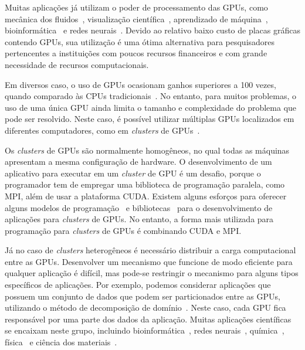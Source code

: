 Muitas aplicações já utilizam o poder de processamento das GPUs, como mecânica
dos fluidos~\citep{fluido}, visualização científica~\citep{visualizacao},
aprendizado de máquina~\citep{Aprendizado}, bioinformática~\citep{rozante} e redes
neurais~\citep{siang}. Devido ao relativo baixo custo de placas gráficas contendo
GPUs, sua utilização é uma ótima alternativa para pesquisadores pertencentes a
instituições com poucos recursos financeiros e com grande necessidade de
recursos computacionais.

Em diversos caso, o uso de GPUs ocasionam ganhos superiores a 100 vezes, quando
comparado às CPUs tradicionais~\citep{Vouzis15012011}. No entanto, para muitos problemas, o uso de uma
única GPU ainda limita o tamanho e complexidade do problema que pode ser
resolvido. Neste caso, é possível utilizar múltiplas GPUs localizados em
diferentes computadores, como em \emph{clusters} de GPUs~\citep{raphael,
  cluster}.

Os \emph{clusters} de GPUs são normalmente homogêneos, no qual todas as
máquinas apresentam a mesma configuração de hardware. O desenvolvimento de um
aplicativo para executar em um \emph{cluster} de GPU é um desafio, porque o
programador tem de empregar uma biblioteca de programação paralela, como MPI,
além de usar a plataforma CUDA. Existem alguns esforços para oferecer alguns
modelos de programação~\citep{appCientificas, wave} e bibliotecas~\citep{snucl,
  Flat} para o desenvolvimento de aplicações para \emph{clusters} de GPUs. No
entanto, a forma mais utilizada para programação para \emph{clusters} de GPUs
é combinando CUDA e MPI.

Já no caso de \emph{clusters} heterogêneos é necessário distribuir a carga
computacional entre as GPUs. Desenvolver um mecanismo que funcione de modo
eficiente para qualquer aplicação é difícil, mas pode-se restringir o mecanismo
para alguns tipos específicos de aplicações. Por exemplo, podemos considerar
aplicações que possuem um conjunto de dados que podem ser particionados entre as
GPUs, utilizando o método de decomposição de domínio~\citep{CNM:CNM1640090307}. Neste caso, cada GPU fica
responsável por uma parte dos dados da aplicação. Muitas aplicações científicas
se encaixam neste grupo, incluindo bioinformática~\citep{rozante}, redes
neurais~\citep{siang}, química~\citep{anastas2000green}, física~\citep{delpech2009reactor} e ciência dos materiais~\citep{da2007desenvolvimento}. 


